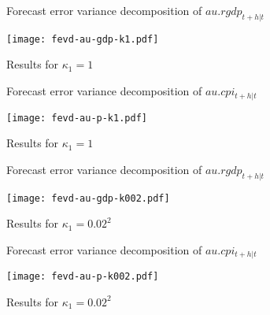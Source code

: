 \documentclass[notes,blackandwhite,mathsans,usenames,dvipsnames]{beamer}
\begin{document}
\begin{frame}{Forecast error variance decomposition of $au.rgdp_{t+h|t}$}

\centering
\texttt{[image: fevd-au-gdp-k1.pdf]}

\small{\color{mcxs2}Results for $\kappa_1=1$}
\end{frame}









\begin{frame}{Forecast error variance decomposition of $au.cpi_{t+h|t}$}

\centering
\texttt{[image: fevd-au-p-k1.pdf]}

\small{\color{mcxs2}Results for $\kappa_1=1$}
\end{frame}







\begin{frame}{Forecast error variance decomposition of $au.rgdp_{t+h|t}$}

\centering
\texttt{[image: fevd-au-gdp-k002.pdf]}

\small{\color{mcxs2}Results for $\kappa_1=0.02^2$}
\end{frame}




\begin{frame}{Forecast error variance decomposition of $au.cpi_{t+h|t}$}

\centering
\texttt{[image: fevd-au-p-k002.pdf]}

\small{\color{mcxs2}Results for $\kappa_1=0.02^2$}
\end{frame}









%
%
\end{document}
